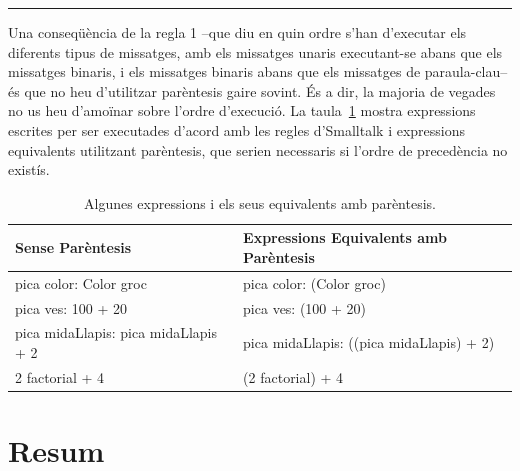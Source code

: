 \noindent
\rule{\textwidth}{2pt}
\vspace{3mm}

Una conseqüència de la regla 1 --que diu en quin ordre s'han d'executar els diferents tipus de missatges, amb els missatges unaris executant-se abans que els missatges binaris, i els missatges binaris abans que els missatges de paraula-clau-- és que no heu d'utilitzar parèntesis gaire sovint. És a dir, la majoria de vegades no us heu d'amoïnar sobre l'ordre d'execució. La taula~\ref{tab1104} mostra expressions escrites per ser executades d'acord amb les regles d'Smalltalk i expressions equivalents utilitzant parèntesis, que serien necessaris si l'ordre de precedència no existís.    



\begin{table}[h]
\caption{Algunes expressions i els seus equivalents amb parèntesis.}
\label{tab1104}
\begin{center}
{\small \begin{tabular}{p{70mm}p{70mm}}
\hline
\textbf{Sense Parèntesis} & \textbf{Expressions Equivalents amb Parèntesis} \\
\hline
\textsf{pica color: Color groc} & \textsf{pica color: (Color groc)} \\
\textsf{pica ves: 100 + 20} & \textsf{pica ves: (100 + 20)} \\
\textsf{pica midaLlapis: pica midaLlapis + 2} & \textsf{pica midaLlapis: ((pica midaLlapis) + 2)}\\
\textsf{2 factorial + 4} & \textsf{(2 factorial) + 4} \\
\hline
\end{tabular}}
\end{center}
\end{table}

\newpage

\section{Resum}

